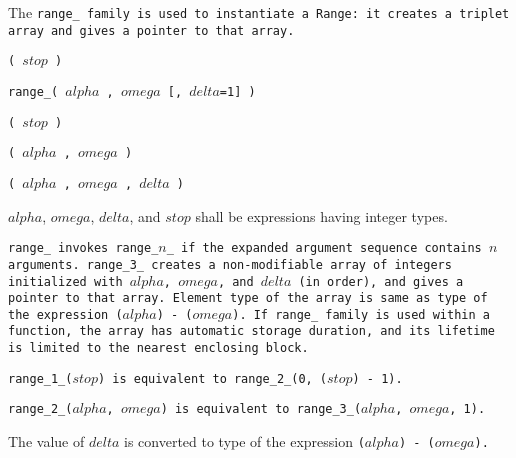 The \tt{range_} family is used to instantiate a \tt{Range}:
it creates a triplet array and gives a pointer to that array.


\s\s\s\tt{(} $stop$  \tt{)}

 \tt{range_}\s\s\s\tt{(} $alpha$ \tt{,} $omega$ [\tt{,} $delta$\tt{=1}] \tt{)}

\s\tt{(} $stop$  \tt{)}

\s\tt{(} $alpha$ \tt{,} $omega$ \tt{)}

\s\tt{(} $alpha$ \tt{,} $omega$ \phantom{[}\tt{,} $delta$\phantom{]} \tt{)}


$alpha$, $omega$, $delta$, and $stop$ shall be expressions having integer types.


\tt{range_} invokes \tt{range_}$n$\_ if the
expanded argument sequence contains $n$ arguments.
\tt{range_3_} creates a non-modifiable array of integers initialized with
$alpha$, $omega$, and $delta$ (in order), and gives a pointer to that array.
Element type of the array is same as type of the
expression \tt{(}$alpha$\tt{) - (}$omega$\tt{)}.
If \tt{range_} family is used within a function, the array has automatic
storage duration, and its lifetime is limited to the nearest enclosing block.

\tt{range_1_(}$stop$\tt{)} is equivalent to
\tt{range_2_(0, (}$stop$\tt{) - 1)}.

\tt{range_2_(}$alpha$\tt{,} $omega$\tt{)} is equivalent to
\tt{range_3_(}$alpha$\tt{,} $omega$\tt{, 1)}.

\note The value of $delta$ is converted to type of the
expression \tt{(}$alpha$\tt{) - (}$omega$\tt{)}.
